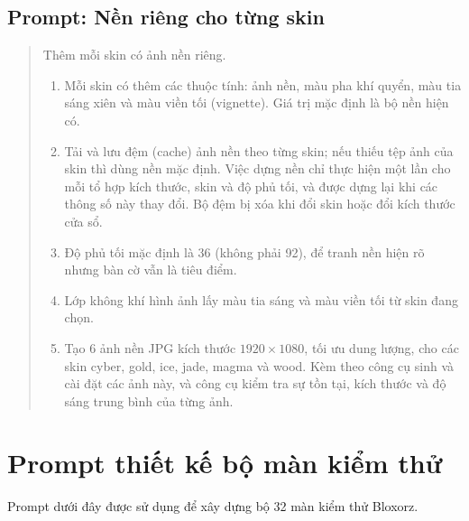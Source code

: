 \subsection*{Prompt: Nền riêng cho từng skin}
\label{sec:prompt-u8}

\begin{quote}
\small
\setlength{\emergencystretch}{2em}
Thêm mỗi skin có ảnh nền riêng.

\begin{enumerate}
  \item Mỗi skin có thêm các thuộc tính: ảnh nền, màu pha khí quyển, màu tia sáng xiên và màu viền tối (vignette). Giá trị mặc định là bộ nền hiện có.

  \item Tải và lưu đệm (cache) ảnh nền theo từng skin; nếu thiếu tệp ảnh của skin thì dùng nền mặc định. Việc dựng nền chỉ thực hiện một lần cho mỗi tổ hợp kích thước, skin và độ phủ tối, và được dựng lại khi các thông số này thay đổi. Bộ đệm bị xóa khi đổi skin hoặc đổi kích thước cửa sổ.

  \item Độ phủ tối mặc định là 36 (không phải 92), để tranh nền hiện rõ nhưng bàn cờ vẫn là tiêu điểm.

  \item Lớp không khí hình ảnh lấy màu tia sáng và màu viền tối từ skin đang chọn.

  \item Tạo 6 ảnh nền JPG kích thước $1920\times1080$, tối ưu dung lượng, cho các skin cyber, gold, ice, jade, magma và wood. Kèm theo công cụ sinh và cài đặt các ảnh này, và công cụ kiểm tra sự tồn tại, kích thước và độ sáng trung bình của từng ảnh.
\end{enumerate}
\end{quote}

\section{Prompt thiết kế bộ màn kiểm thử}
\label{app:testcase}
 
Prompt dưới đây được sử dụng để xây dựng bộ 32 màn kiểm thử Bloxorz.
 
